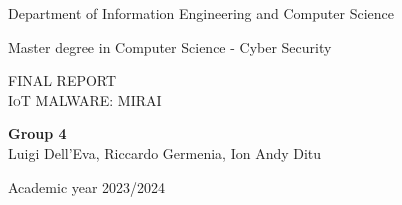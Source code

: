 \pagestyle{plain}

\thispagestyle{empty}

\begin{center}
  \begin{figure}[h!]
    \centerline{}
  \end{figure}

  \vspace{2 cm} 

  \LARGE{Department of Information Engineering and Computer Science\\}

  \vspace{1 cm} 
  \Large{Master degree in Computer Science - Cyber Security}

  \vspace{2 cm} 
  \Large\textsc{FINAL REPORT\\} 
  \vspace{1 cm} 
  \Huge\textsc{IoT MALWARE: MIRAI\\}

  \vspace{2 cm} 
  \begin{centering}
        \Large{\textbf{Group 4}}\\
        \Large{Luigi Dell'Eva, Riccardo Germenia, Ion Andy Ditu}
  \end{centering}
  \vspace{4 cm} 

  \Large{Academic year 2023/2024}
  
\end{center}